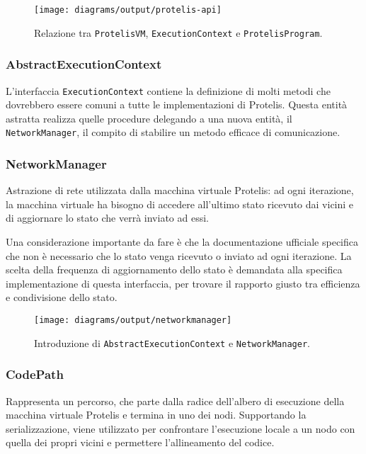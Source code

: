 \begin{figure}
  \centering
  \texttt{[image: diagrams/output/protelis-api]}
  \caption{Relazione tra \texttt{ProtelisVM}, \texttt{ExecutionContext} e
      \texttt{ProtelisProgram}.}
  \label{fig:uml-protelisvm}
\end{figure}

\subsubsection{AbstractExecutionContext}
L'interfaccia \texttt{ExecutionContext} contiene la definizione di molti metodi
che dovrebbero essere comuni a tutte le implementazioni di Protelis. Questa
entità astratta realizza quelle procedure delegando a una nuova entità, il
\texttt{NetworkManager}, il compito di stabilire un metodo efficace di
comunicazione.

\subsubsection{NetworkManager}
\label{sec:network-manager}
Astrazione di rete utilizzata dalla macchina virtuale Protelis: ad ogni
iterazione, la macchina virtuale ha bisogno di accedere all'ultimo stato ricevuto
dai vicini e di aggiornare lo stato che verrà inviato ad essi.

Una considerazione importante da fare è che la documentazione ufficiale
specifica che non è necessario che lo stato venga ricevuto o inviato ad ogni
iterazione. La scelta della frequenza di aggiornamento dello stato è demandata
alla specifica implementazione di questa interfaccia, per trovare il rapporto
giusto tra efficienza e condivisione dello stato.

\begin{figure}
  \centering
  \texttt{[image: diagrams/output/networkmanager]}
    \caption{Introduzione di \texttt{AbstractExecutionContext} e \texttt{NetworkManager}.}
  \label{fig:uml-networkmanager}
\end{figure}

\subsubsection{CodePath}
Rappresenta un percorso, che parte dalla radice dell'albero di esecuzione della
macchina virtuale Protelis e termina in uno dei nodi. Supportando la
serializzazione, viene utilizzato per confrontare l'esecuzione locale a un nodo
con quella dei propri vicini e permettere l'allineamento del codice. 

